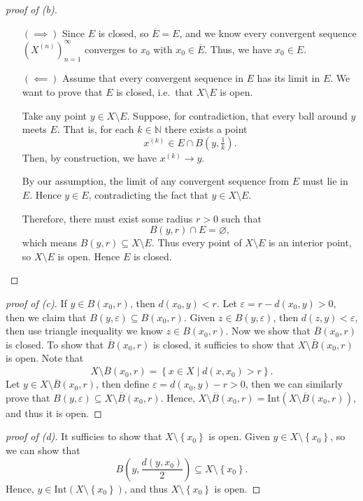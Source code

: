 \begin{proof}[proof of (b)]
    \vphantom{text}
\begin{itemize}
    \item [\((\implies )\)] Since \(E\) is closed, so \(\overline{E} = E \), and we know every convergent sequence \(\left( X^{(n)} \right)_{n=1}^{\infty}  \) converges to \(x_0\) with \(x_0 \in \overline{E} \). Thus, we have \(x_0 \in E\). 
    \item [\((\impliedby )\)] Assume that every convergent sequence in $E$ has its limit in $E$.  
We want to prove that $E$ is closed, i.e.\ that $X \setminus E$ is open.

Take any point $y \in X \setminus E$.  
Suppose, for contradiction, that every ball around $y$ meets $E$.  
That is, for each $k \in \mathbb{N}$ there exists a point 
\[
x^{(k)} \in E \cap B\!\left(y, \tfrac{1}{k}\right).
\]
Then, by construction, we have $x^{(k)} \to y$.  

By our assumption, the limit of any convergent sequence from $E$ 
must lie in $E$. Hence $y \in E$, contradicting the fact that $y \in X \setminus E$.

Therefore, there must exist some radius $r > 0$ such that
\[
B(y,r) \cap E = \varnothing,
\]
which means $B(y,r) \subseteq X \setminus E$.  
Thus every point of $X \setminus E$ is an interior point, so $X \setminus E$ is open.  
Hence $E$ is closed.
\end{itemize}
\end{proof}
\begin{proof}[proof of (c)]
    If \(y \in B(x_0, r)\), then \(d(x_0, y) < r\). Let \(\varepsilon = r - d(x_0, y) > 0\), then we claim that \(B(y, \varepsilon ) \subseteq B(x_0, r)\).  Given \(z \in B(y, \varepsilon )\), then \(d(z, y) < \varepsilon \), then use triangle inequality we know \(z \in B(x_0, r)\). Now we show that \(\overline{B}(x_0, r) \) is closed. To show that \(\overline{B}(x_0, r) \) is closed, it sufficies to show that \(X \setminus \overline{B}(x_0, r) \) is open. Note that 
    \[
        X \setminus \overline{B}(x_0, r) = \left\{ x \in X \mid d(x, x_0) > r \right\}. 
    \]      Let \(y \in X \setminus \overline{B}(x_0, r) \), then define \(\varepsilon = d(x_0, y) - r > 0\), then we can similarly prove that \(B(y, \varepsilon ) \subseteq X \setminus \overline{B}(x_0, r)\).    Hence, \(X \setminus \overline{B}(x_0, r) = \mathrm{Int}(X \setminus \overline{B}(x_0, r) ) \), and thus it is open.    
\end{proof}
\begin{proof}[proof of (d)]
    It sufficies to show that \(X \setminus \left\{ x_0 \right\} \) is open. Given \(y \in X \setminus \left\{ x_0 \right\} \), so we can show that 
    \[
        B\left( y, \frac{d(y,x_0)}{2} \right) \subseteq X \setminus \left\{ x_0 \right\}. 
    \]
    Hence, \(y \in \mathrm{Int}(X \setminus \left\{ x_0 \right\} ) \), and thus \(X \setminus \left\{ x_0 \right\} \) is open.  
\end{proof}
